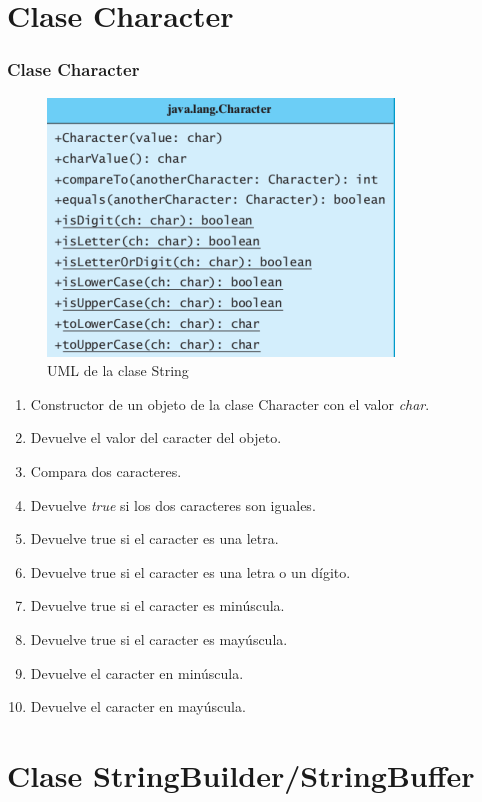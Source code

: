 \documentclass{beamer}
\begin{document}
\section{Clase Character}
\begin{frame}
\frametitle{Clase Character} 
\begin{multicols}{2}
\begin{figure}
\includegraphics[scale=0.55]{imagenes/char.png} 
\caption{UML de la clase String}
\end{figure} 
\begin{scriptsize}
\begin{enumerate}[<+-| alert@+>]
      \item Constructor de un objeto de la clase Character con el valor \emph{char}.
      \item Devuelve el valor del caracter del objeto.
      \item Compara dos caracteres. 
     \item Devuelve \emph{true} si los dos caracteres son iguales.
      \item Devuelve true si el caracter es una letra.
      \item Devuelve true si el caracter es una letra o un dígito.
      \item Devuelve true si el caracter es minúscula.
      \item Devuelve true si el caracter es mayúscula.
      \item Devuelve el caracter en minúscula.
      \item Devuelve el caracter en mayúscula.
      \end{enumerate}
\end{scriptsize}
\end{multicols}
\pause
\end{frame}

\section{Clase StringBuilder/StringBuffer}
\end{document}
